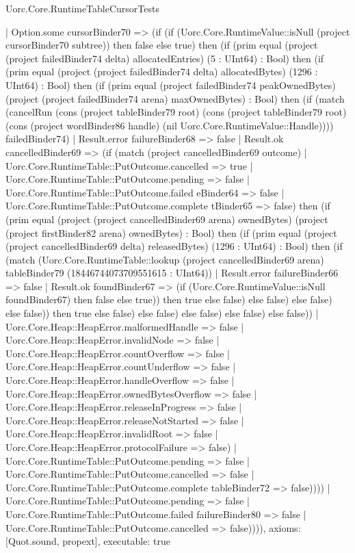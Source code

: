 \begin{lexlean}{Uorc.Core.RuntimeTableCursorTests}
\begin{semanticmodule}
{                      | Option.some cursorBinder70 => (if (if (Uorc.Core.RuntimeValue::isNull (project cursorBinder70 subtree)) then false else true) then (if (prim equal (project (project failedBinder74 delta) allocatedEntries) (5 : UInt64) : Bool) then (if (prim equal (project (project failedBinder74 delta) allocatedBytes) (1296 : UInt64) : Bool) then (if (prim equal (project failedBinder74 peakOwnedBytes) (project (project failedBinder74 arena) maxOwnedBytes) : Bool) then (if (match (cancelRun (cons (project tableBinder79 root) (cons (project tableBinder79 root) (cons (project wordBinder86 handle) (nil Uorc.Core.RuntimeValue::Handle)))) failedBinder74)
                        | Result.error failureBinder68 => false
                        | Result.ok cancelledBinder69 => (if (match (project cancelledBinder69 outcome)
                          | Uorc.Core.RuntimeTable::PutOutcome.cancelled => true
                          | Uorc.Core.RuntimeTable::PutOutcome.pending => false
                          | Uorc.Core.RuntimeTable::PutOutcome.failed eBinder64 => false
                          | Uorc.Core.RuntimeTable::PutOutcome.complete tBinder65 => false) then (if (prim equal (project (project cancelledBinder69 arena) ownedBytes) (project (project firstBinder82 arena) ownedBytes) : Bool) then (if (prim equal (project (project cancelledBinder69 delta) releasedBytes) (1296 : UInt64) : Bool) then (if (match (Uorc.Core.RuntimeTable::lookup (project cancelledBinder69 arena) tableBinder79 (18446744073709551615 : UInt64))
                          | Result.error failureBinder66 => false
                          | Result.ok foundBinder67 => (if (Uorc.Core.RuntimeValue::isNull foundBinder67) then false else true)) then true else false) else false) else false) else false)) then true else false) else false) else false) else false) else false))
                    | Uorc.Core.Heap::HeapError.malformedHandle => false
                    | Uorc.Core.Heap::HeapError.invalidNode => false
                    | Uorc.Core.Heap::HeapError.countOverflow => false
                    | Uorc.Core.Heap::HeapError.countUnderflow => false
                    | Uorc.Core.Heap::HeapError.handleOverflow => false
                    | Uorc.Core.Heap::HeapError.ownedBytesOverflow => false
                    | Uorc.Core.Heap::HeapError.releaseInProgress => false
                    | Uorc.Core.Heap::HeapError.releaseNotStarted => false
                    | Uorc.Core.Heap::HeapError.invalidRoot => false
                    | Uorc.Core.Heap::HeapError.protocolFailure => false)
                  | Uorc.Core.RuntimeTable::PutOutcome.pending => false
                  | Uorc.Core.RuntimeTable::PutOutcome.cancelled => false
                  | Uorc.Core.RuntimeTable::PutOutcome.complete tableBinder72 => false))))
          | Uorc.Core.RuntimeTable::PutOutcome.pending => false
          | Uorc.Core.RuntimeTable::PutOutcome.failed failureBinder80 => false
          | Uorc.Core.RuntimeTable::PutOutcome.cancelled => false)))),
  axioms: [Quot.sound, propext],
  executable: true
}


\end{semanticmodule}
\end{lexlean}
